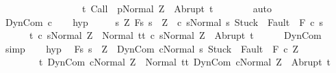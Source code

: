 \begin{isabellebody}
\ \ \ \ \ \ \ \ \ \ \ \ \ \ \ \ \ {\isacharbraceleft}t{\isachardot}\ {\isasymGamma}{\isasymturnstile}{\isasymlangle}Call\ \ p{\isacharcomma}Normal\ Z{\isasymrangle}\ {\isasymRightarrow}\ Abrupt\ t{\isacharbraceright}{\isachardoublequoteclose}\isanewline
\ \ \ \ \ \ \isamarkupfalse%
\ {\isacharparenleft}auto{\isacharparenright}\isanewline
\ \ \isamarkupfalse%
\isanewline
{}\isamarkupfalse%
\isanewline
\ \ \isamarkupfalse%
\ {\isacharparenleft}DynCom\ c{\isacharparenright}\isanewline
\ \ \isamarkupfalse%
\ hyp{\isacharcolon}\ \isanewline
\ \ \ \ {\isachardoublequoteopen}{\isasymAnd}s{\isacharprime}{\isachardot}\ {\isasymforall}Z{\isachardot}\ {\isasymGamma}{\isacharcomma}{\isasymTheta}{\isasymturnstile}\isactrlbsub {\isacharslash}F\isactrlesub {\isacharbraceleft}s{\isachardot}\ s\ {\isacharequal}\ Z\ {\isasymand}\ {\isasymGamma}{\isasymturnstile}{\isasymlangle}c\ s{\isacharprime}{\isacharcomma}Normal\ s{\isasymrangle}\ {\isasymRightarrow}{\isasymnotin}{\isacharparenleft}{\isacharbraceleft}Stuck{\isacharbraceright}\ {\isasymunion}\ Fault\ {\isacharbackquote}\ {\isacharparenleft}{\isacharminus}F{\isacharparenright}{\isacharparenright}{\isacharbraceright}\ c\ s{\isacharprime}\isanewline
\ \ \ \ \ \ {\isacharbraceleft}t{\isachardot}\ {\isasymGamma}{\isasymturnstile}{\isasymlangle}c\ s{\isacharprime}{\isacharcomma}Normal\ Z{\isasymrangle}\ {\isasymRightarrow}\ Normal\ t{\isacharbraceright}{\isacharcomma}{\isacharbraceleft}t{\isachardot}\ {\isasymGamma}{\isasymturnstile}{\isasymlangle}c\ s{\isacharprime}{\isacharcomma}Normal\ Z{\isasymrangle}\ {\isasymRightarrow}\ Abrupt\ t{\isacharbraceright}{\isachardoublequoteclose}\isanewline
\ \ \ \ \isamarkupfalse%
\ DynCom\ \isamarkupfalse%
\ simp\isanewline
\ \ \isamarkupfalse%
\ hyp{\isacharprime}{\isacharcolon}\isanewline
\ \ {\isachardoublequoteopen}{\isasymGamma}{\isacharcomma}{\isasymTheta}{\isasymturnstile}\isactrlbsub {\isacharslash}F\isactrlesub {\isacharbraceleft}s{\isachardot}\ s\ {\isacharequal}\ Z\ {\isasymand}\ {\isasymGamma}{\isasymturnstile}{\isasymlangle}DynCom\ c{\isacharcomma}Normal\ s{\isasymrangle}\ {\isasymRightarrow}{\isasymnotin}{\isacharparenleft}{\isacharbraceleft}Stuck{\isacharbraceright}\ {\isasymunion}\ Fault\ {\isacharbackquote}\ {\isacharparenleft}{\isacharminus}F{\isacharparenright}{\isacharparenright}{\isacharbraceright}\ c\ Z\isanewline
\ \ \ \ \ \ \ \ {\isacharbraceleft}t{\isachardot}\ {\isasymGamma}{\isasymturnstile}{\isasymlangle}DynCom\ c{\isacharcomma}Normal\ Z{\isasymrangle}\ {\isasymRightarrow}\ Normal\ t{\isacharbraceright}{\isacharcomma}{\isacharbraceleft}t{\isachardot}\ {\isasymGamma}{\isasymturnstile}{\isasymlangle}DynCom\ c{\isacharcomma}Normal\ Z{\isasymrangle}\ {\isasymRightarrow}\ Abrupt\ t{\isacharbraceright}{\isachardoublequoteclose}\isanewline

\end{isabellebody}
